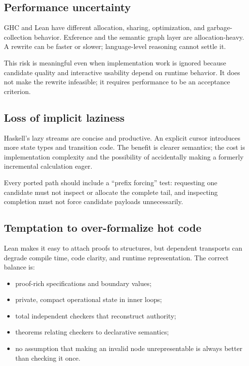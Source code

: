 \documentclass[10pt,letterpaper,oneside]{report}
\begin{document}
\subsection{Performance uncertainty}

GHC and Lean have different allocation, sharing, optimization, and garbage-collection behavior. Exference and the semantic graph layer are allocation-heavy. A rewrite can be faster or slower; language-level reasoning cannot settle it.

This risk is meaningful even when implementation work is ignored because candidate quality and interactive usability depend on runtime behavior. It does not make the rewrite infeasible; it requires performance to be an acceptance criterion.

\subsection{Loss of implicit laziness}

Haskell's lazy streams are concise and productive. An explicit cursor introduces more state types and transition code. The benefit is clearer semantics; the cost is implementation complexity and the possibility of accidentally making a formerly incremental calculation eager.

Every ported path should include a ``prefix forcing'' test: requesting one candidate must not inspect or allocate the complete tail, and inspecting completion must not force candidate payloads unnecessarily.

\subsection{Temptation to over-formalize hot code}

Lean makes it easy to attach proofs to structures, but dependent transports can degrade compile time, code clarity, and runtime representation. The correct balance is:

\begin{itemize}
  \item proof-rich specifications and boundary values;
  \item private, compact operational state in inner loops;
  \item total independent checkers that reconstruct authority;
  \item theorems relating checkers to declarative semantics;
  \item no assumption that making an invalid node unrepresentable is always better than checking it once.
\end{itemize}
\end{document}
